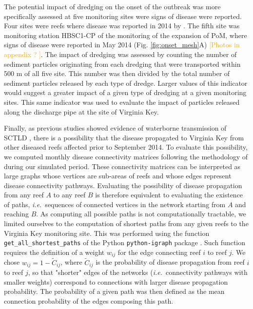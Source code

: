 \documentclass[preprint,12pt,authoryear]{elsarticle}
\newcommand{\ie}{{\it i.e.}\ }
\newcommand{\comment}[1]{\textcolor{orange}{#1}}
\begin{document}
The potential impact of dredging on the onset of the outbreak was more specifically assessed at five monitoring sites were signs of disease were reported. Four sites were reefs where disease was reported in 2014 by \cite{precht2016unprecedented}. The fifth site was monitoring station HBSC1-CP of the monitoring of the expansion of PoM, where signs of disease were reported in May 2014 (Fig. \ref{fig:onset_mesh}A) \comment{[Photos in appendix ? ]}. The impact of dredging was assessed by counting the number of sediment particles originating from each dredging that were transported within 500 m of all five site. This number was then divided by the total number of sediment particles released by each type of dredge. Larger values of this indicator would suggest a greater impact of a given type of dredging at a given monitoring sites. This same indicator was used to evaluate the impact of particles released along the discharge pipe at the site of Virginia Key.  

Finally, as previous studies showed evidence of waterborne transmission of SCTLD \citep{aeby2019pathogenesis, dobbelaere2020coupled,eaton2021measuring, meiling2021variable}, there is a possibility that the disease propagated to Virginia Key from other diseased reefs affected prior to September 2014. To evaluate this possibility, we computed monthly disease connectivity matrices following the methodology of \cite{dobbelaere2020coupled} during our simulated period. These connectivity matrices can be interpreted as large graphs whose vertices are sub-areas of reefs and whose edges represent disease connectivity pathways. Evaluating the possibility of disease propagation from any reef $A$ to any reef $B$ is therefore equivalent to evaluating the existence of paths, \ie sequences of connected vertices in the network starting from $A$ and reaching $B$. As computing all possible paths is not computationally tractable, we limited ourselves to the computation of shortest paths from any given reefs to the Virginia Key monitoring site. This was performed using the function \texttt{get\_all\_shortest\_paths} of the Python \texttt{python-igraph} package \citep{csardi2006igraph}. Such function requires the definition of a weight $w_{ij}$ for the edge connecting reef $i$ to reef $j$. We chose $w_{ij} = 1-\tilde{C}_{ij}$, where $\tilde{C}_{ij}$ is the probability of disease propagation from reef $i$ to reef $j$, so that "shorter" edges of the networks (\ie connectivity pathways with smaller weights) correspond to connections with larger disease propagation probability. The probability of a given path was then defined as the mean connection probability of the edges composing this path.
\end{document}

